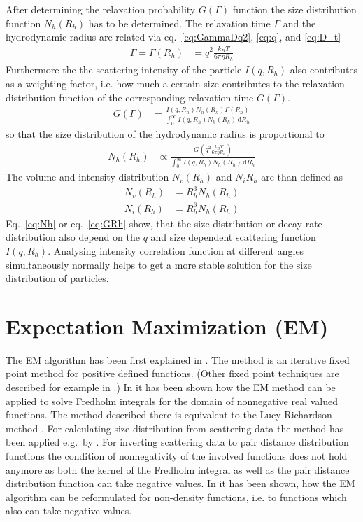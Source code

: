 After determining the relaxation probability $G(\Gamma)$ function the size distribution function $N_h(R_h)$ has to be determined. The relaxation time $\Gamma$ and the hydrodynamic radius are related via eq.\ \ref{eq:GammaDq2}, \ref{eq:q}, and \ref{eq:D_t}
\begin{align}
\Gamma = \Gamma(R_h)&= q^2 \frac{k_BT}{6\pi\eta R_h}
\end{align}
Furthermore the the scattering intensity of the particle $I(q,R_h)$ also contributes as a weighting factor, i.e. how much a certain size contributes to the relaxation distribution function of the corresponding relaxation time $G(\Gamma)$.
\begin{align}
\label{eq:GRh}
G(\Gamma) &= \frac{I(q,R_h) N_h(R_h) \Gamma(R_h)} {\int_0^\infty I(q,R_h) N_h(R_h) \, \mathrm{d}R_h}
\end{align}
so that the size distribution of the hydrodynamic radius is proportional to
\begin{align}
\label{eq:Nh}
N_h(R_h) &\propto  \frac{G\left(q^2 \frac{k_BT}{6\pi\eta R_h}\right)}{\int_0^\infty I(q,R_h) N_h(R_h) \, \mathrm{d}R_h}
\end{align}
The volume and intensity distribution $N_v(R_h)$ and $N_i{R_h}$ are than defined as
\begin{align}
N_v(R_h) &= R_h^3 N_h(R_h) \\
N_i(R_h) &= R_h^6 N_h(R_h)
\end{align}
Eq.\ \ref{eq:Nh} or eq.\ \ref{eq:GRh} show, that the size distribution or decay rate distribution also depend on the $q$ and size dependent scattering function $I(q,R_h)$. Analysing intensity correlation function at different angles simultaneously normally helps to get a more stable solution for the size distribution of particles.

\section{Expectation Maximization (EM)}
The EM algorithm has been first explained in \cite{Dempster1977}. The method is an iterative fixed point method for positive defined functions. (Other fixed point techniques are described for example in \cite{Hanke2000}.) In \cite{Vardi1993} it has been shown how the EM method can be applied to solve Fredholm integrals for the domain of nonnegative real valued functions. The method described there is equivalent to the Lucy\hyp{}Richardson method \cite{Richardson1972,Lucy1974}. For calculating size distribution from scattering data the method has been applied e.g.\ by \cite{Yang2013,Benvenuto2016,Benvenuto2017}. For inverting scattering data to pair distance distribution functions the condition of nonnegativity of the involved functions does not hold anymore as both the kernel of the Fredholm integral as well as the pair distance distribution function can take negative values. In \cite{Chae2018} it has been shown, how the EM algorithm can be reformulated for non-density functions, i.e. to functions which also can take negative values.

